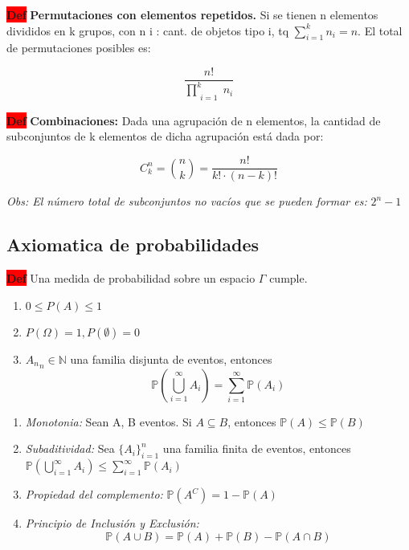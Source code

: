 \documentclass[letterpaper,10.5pt,twocolumn]{article} %
\newcommand{\Proba}{\mathbb{P} }
\newcommand{\hlc}[2][yellow]{ \colorbox{#1}{#2} }
\newcommand{\Def}{\hlc[red]{\bfseries Def}}
\begin{document}

\Def \textbf{Permutaciones con elementos repetidos.} Si se tienen n elementos divididos en k grupos, con n i : cant. de objetos tipo i, tq $\sum_{i=1}^{k} n_i = n$. El total de permutaciones posibles es:

\begin{equation*}
    \dfrac{n!}{\prod_{\substack{i=1}}^{k} n_i}
\end{equation*}


\Def \textbf{Combinaciones:} Dada una agrupación de n elementos, la cantidad de subconjuntos de k elementos de dicha agrupación está dada por:

\begin{equation*}
    C_{k}^{n} = \binom{n}{k} = \dfrac{n!}{k! \cdot (n-k)!}
\end{equation*}

\textit{Obs: El número total de subconjuntos no vacíos que se pueden
 formar es:} $2^n - 1$


\subsection{Axiomatica de probabilidades}

\Def Una medida de probabilidad sobre un espacio $\Gamma$ cumple.

\newcommand{\setref}[1]{\def\@currentlabel{#1}}
\begin{enumerate}[label={(A\arabic*)}, leftmargin=*, itemsep=0pt]
  \item $ 0 \leq P(A) \leq 1$
  \item $ P(\Omega) = 1, P(\emptyset) = 0$
  \item ${A_n}_n\in \mathbb{N}$ una familia disjunta de eventos, entonces
$$\mathbb{P} \left(\bigcup_{i=1}^{\infty} A_i \right) =\sum_{i=1}^{\infty} \mathbb{P}( A_i )$$
\end{enumerate}

\begin{enumerate}[label={(\textit{\arabic*})}, leftmargin=*, itemsep=0pt]
\item \textit{Monotonia:} Sean A, B eventos. Si $A\subseteq B$, entonces $\Proba (A) \leq \Proba (B)$
\item \textit{Subaditividad:} Sea $\{A_i \}_{i=1}^{n} $ una familia finita de eventos, entonces $\Proba \left(\bigcup_{i=1}^{\infty} A_i \right) \leq \sum_{i=1}^{\infty} \Proba (A_i)$
\item \textit{Propiedad del complemento:} $\Proba (A^C) = 1- \Proba (A) $
\item \textit{Principio de Inclusión y Exclusión:} $$\Proba (A\cup B) = \Proba (A) + \Proba (B) - \Proba (A \cap B) $$
\end{enumerate}
\end{document}
